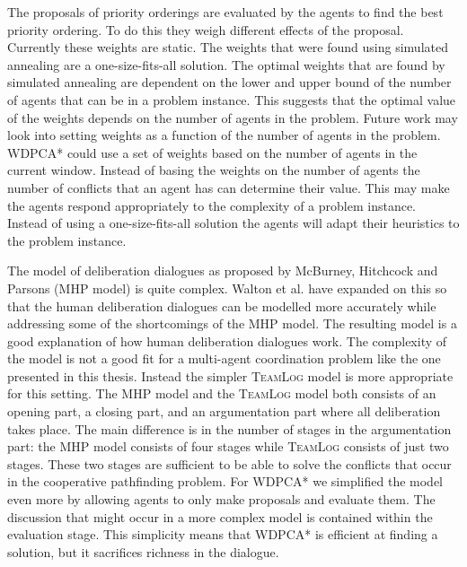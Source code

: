 The proposals of priority orderings are evaluated by the agents to find the
best priority ordering. To do this they weigh different effects of the proposal.
Currently these weights are static. The weights that were found using simulated
annealing are a one-size-fits-all solution. The optimal weights that are found
by simulated annealing are dependent on the lower and upper bound of the number
of agents that can be in a problem instance. This suggests that the optimal
value of the weights depends on the number of agents in the problem. Future
work may look into setting weights as a function of the number of agents in the
problem. WDPCA* could use a set of weights based on the number of agents in the
current window. Instead of basing the weights on the number of agents the
number of conflicts that an agent has can determine their value. This may make
the agents respond appropriately to the complexity of a problem instance.
Instead of using a one-size-fits-all solution the agents will adapt their
heuristics to the problem instance.


The model of deliberation dialogues as proposed by McBurney, Hitchcock and
Parsons (MHP model) \cite{mcburney2007} is quite complex. Walton et al.
\cite{walton2014} have expanded on this so that the human deliberation
dialogues can be modelled more accurately while addressing some of the
shortcomings of the MHP model. The resulting model is a good explanation of how 
human deliberation dialogues work. The complexity of the model is not a good 
fit for a multi-agent coordination problem like the one presented in this 
thesis. Instead the simpler \textsc{TeamLog} model \cite{dunin-keplicz2011} is 
more appropriate for this setting. The MHP model and the \textsc{TeamLog} model 
both consists of an opening part, a closing part, and an argumentation part 
where all deliberation takes place. The main difference is in the number of 
stages in the argumentation part: the MHP model consists of four stages while 
\textsc{TeamLog} consists of just two stages. These two stages are sufficient 
to be able to solve the conflicts that occur in the cooperative pathfinding 
problem. For WDPCA* we simplified the model even more by allowing agents to 
only make proposals and evaluate them. The discussion that might occur in a 
more complex model is contained within the evaluation stage. This simplicity 
means that WDPCA* is efficient at finding a solution, but it sacrifices 
richness in the dialogue.

